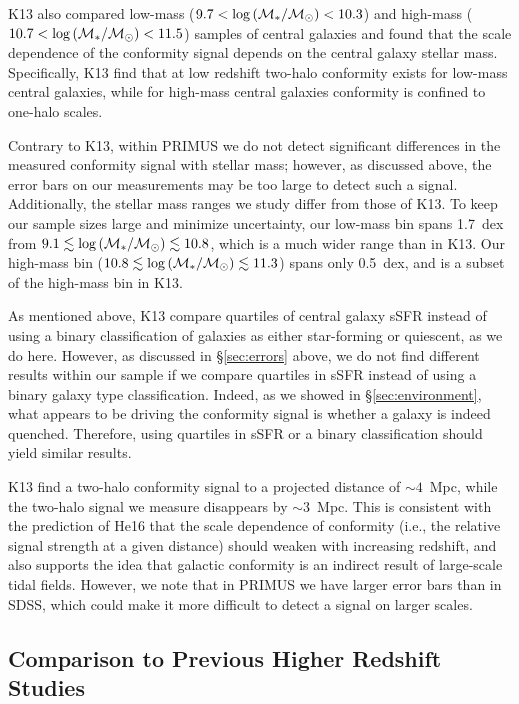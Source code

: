 K13 also compared low-mass ($9.7 < \logM < 10.3$) and high-mass ($10.7 < \logM < 11.5$) samples of 
central galaxies and found that the scale dependence of the conformity signal depends on the central 
galaxy stellar mass.  Specifically, K13 find that at low redshift two-halo conformity exists for 
low-mass central galaxies, while for high-mass central galaxies conformity is confined to one-halo scales.

Contrary to K13, within PRIMUS we do not detect significant differences in the measured conformity 
signal with stellar mass;
however, as discussed above, the error bars on our measurements may be too large to detect such a signal.
Additionally, the stellar mass ranges we study differ from those of K13.
To keep our sample sizes large and minimize uncertainty, our low-mass bin spans 1.7~dex from 
${9.1 \lesssim \logM \lesssim 10.8}$, which is a much wider range than in K13.
Our high-mass bin (${10.8 \lesssim \logM \lesssim 11.3}$) spans only 0.5~dex, and is a subset of the high-mass bin in K13.

As mentioned above, K13 compare quartiles of central galaxy sSFR instead of using a binary classification of galaxies as either star-forming or quiescent, as we do here.
However, as discussed in \S\ref{sec:errors} above, we do not find different results within our sample if we compare quartiles in sSFR instead of using a binary galaxy type classification.
Indeed, as we showed in \S\ref{sec:environment}, what appears to be driving the conformity signal is whether a galaxy is indeed quenched.
Therefore, using quartiles in sSFR or a binary classification should yield similar results.

K13 find a two-halo conformity signal to a projected distance of $\sim4$~Mpc, while the two-halo signal we measure disappears by $\sim3$~Mpc.
This is consistent with the prediction of He16 that the scale dependence of conformity (i.e., the relative signal strength at a given distance) should weaken with increasing redshift, and also supports the idea that galactic conformity is an indirect result of large-scale tidal fields.
However, we note that in PRIMUS we have larger error bars than in SDSS, which could make it more difficult to detect a signal on larger scales.

\subsection{Comparison to Previous Higher Redshift Studies}\label{sec:compare_high}

